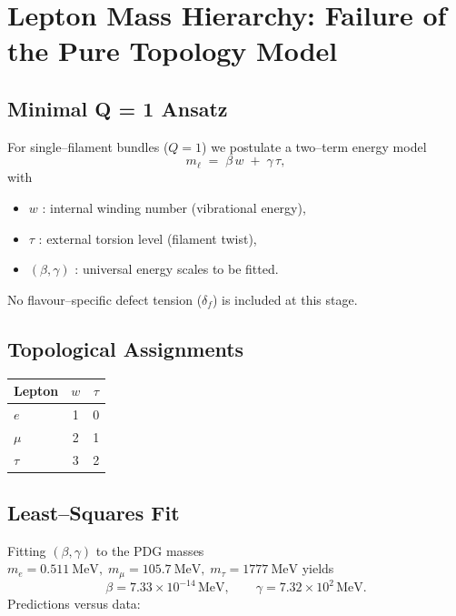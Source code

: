 

\section{Lepton Mass Hierarchy: Failure of the Pure Topology Model}
\label{sec:lepton_mass_failure}

\subsection{Minimal Q = 1 Ansatz}

For single–filament bundles ($Q=1$) we postulate a two–term energy model
\[
m_\ell \;=\; \beta\,w \;+\; \gamma\,\tau ,
\]
with
\begin{itemize}
  \item $w$ : internal winding number (vibrational energy),
  \item $\tau$ : external torsion level (filament twist),
  \item $(\beta,\gamma)$ : universal energy scales to be fitted.
\end{itemize}
No flavour–specific defect tension ($\delta_f$) is included at this stage.

\subsection{Topological Assignments}

\begin{center}
\begin{tabular}{lcc}
\toprule
Lepton & $w$ & $\tau$ \\
\midrule
$e$   & 1 & 0 \\
$\mu$ & 2 & 1 \\
$\tau$ & 3 & 2 \\
\bottomrule
\end{tabular}
\end{center}

\subsection{Least–Squares Fit}

Fitting $(\beta,\gamma)$ to the PDG masses
$m_e=0.511~\text{MeV},\; m_\mu=105.7~\text{MeV},\;
m_\tau=1777~\text{MeV}$ yields
\[
\beta = 7.33\times 10^{-14}\,\text{MeV}, \qquad
\gamma = 7.32\times 10^{2}\,\text{MeV}.
\]
Predictions versus data:

